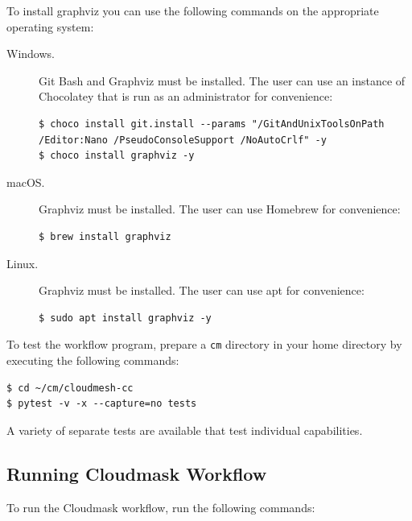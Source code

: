 \documentclass[sigplan,screen]{acmart}
\newcommand{\FILE}[1]{}
\begin{document}
To install graphviz you can use the following commands on the
appropriate operating system:

\begin{description}

\item[Windows.]  Git Bash and Graphviz must be installed. The user
can use an instance of Chocolatey that is run as an administrator for
convenience:

\begin{verbatim}
$ choco install git.install --params "/GitAndUnixToolsOnPath /Editor:Nano /PseudoConsoleSupport /NoAutoCrlf" -y
$ choco install graphviz -y
\end{verbatim}

\item[macOS.] Graphviz must be installed. The user can use Homebrew
for convenience:

\begin{verbatim}
$ brew install graphviz
\end{verbatim}

\item[Linux.] Graphviz must be installed. The user can use apt for
convenience:

\begin{verbatim}
$ sudo apt install graphviz -y
\end{verbatim}

\end{description}

To test the workflow program, prepare a {\scriptsize \verb|cm|}
directory in your home directory by executing the following commands:

\begin{verbatim}
$ cd ~/cm/cloudmesh-cc
$ pytest -v -x --capture=no tests
\end{verbatim}

A variety of separate tests are available that test individual
capabilities.


% 

\FILE{cloudmask-appendix.tex}

\subsection{Running Cloudmask Workflow}\label{sec:running-cloudmask}

To run the Cloudmask workflow, run the following commands:
\end{document}
